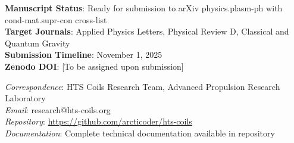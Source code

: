 \documentclass[12pt,a4paper]{article}
\begin{document}
\textbf{Manuscript Status}: Ready for submission to arXiv physics.plasm-ph with cond-mat.supr-con cross-list\\
\textbf{Target Journals}: Applied Physics Letters, Physical Review D, Classical and Quantum Gravity\\
\textbf{Submission Timeline}: November 1, 2025\\
\textbf{Zenodo DOI}: [To be assigned upon submission]

\textit{Correspondence}: HTS Coils Research Team, Advanced Propulsion Research Laboratory\\
\textit{Email}: research@hts-coils.org\\
\textit{Repository}: \url{https://github.com/arcticoder/hts-coils}\\
\textit{Documentation}: Complete technical documentation available in repository
\end{document}
